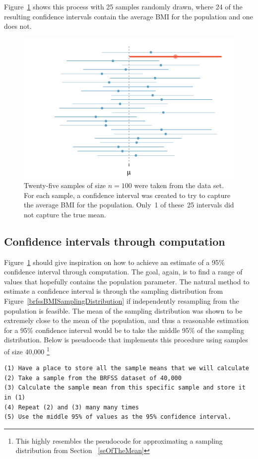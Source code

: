 Figure~\ref{95PercentConfidenceInterval} shows this process with 25 samples randomly drawn, where 24 of the resulting confidence intervals contain the average BMI for the population and one does not. 

\begin{figure}[hht]
   \centering
   \includegraphics[width=\textwidth]{ch_inference_foundations_oi_biostat/figures/95PercentConfidenceInterval/95PercentConfidenceInterval}
   \caption{Twenty-five samples of size $n=100$ were taken from the  data set. For each sample, a confidence interval was created to try to capture the average BMI for the population. Only~1 of these~25 intervals did not capture the true mean.}
   \label{95PercentConfidenceInterval}
\end{figure}

\subsection{Confidence intervals through computation}
\label{confidenceIntervalsComputation}

Figure~\ref{95PercentConfidenceInterval} should give inspiration on how to achieve an estimate of a 95\% confidence interval through computation. The goal, again, is to find a range of values that hopefully contains the population parameter. The natural method to estimate a confidence interval is through the sampling distribution from Figure~\ref{brfssBMISamplingDistribution} if independently resampling from the population is feasible. The mean of the sampling distribution was shown to be extremely close to the mean of the population, and thus a reasonable estimation for a 95\% confidence interval would be to take the middle 95\% of the sampling distribution. Below is pseudocode that implements this procedure using samples of size 40,000 \footnote{This highly resembles the pseudocode for approximating a sampling distribution from Section ~\ref{seOfTheMean}}
\begin{verbatim}
(1) Have a place to store all the sample means that we will calculate
(2) Take a sample from the BRFSS dataset of 40,000
(3) Calculate the sample mean from this specific sample and store it in (1)
(4) Repeat (2) and (3) many many times 
(5) Use the middle 95% of values as the 95% confidence interval. 
\end{verbatim}

